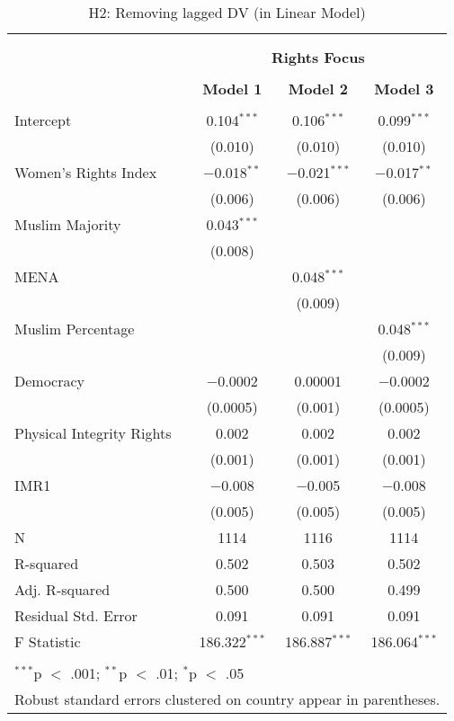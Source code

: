 
\begin{table}[!htbp] \centering 
  \caption{H2: Removing lagged DV (in Linear Model)} 
  \label{} 
\begin{tabular}{@{\extracolsep{5pt}}lccc} 
\\[-1.8ex]\hline \\[-1.8ex] 
\\[-1.8ex] & \multicolumn{3}{c}{\textbf{Rights Focus}} \\ 
\\[-1.8ex] & \textbf{Model 1} & \textbf{Model 2} & \textbf{Model 3}\\ 
\hline \\[-1.8ex] 
 Intercept & 0.104$^{***}$ & 0.106$^{***}$ & 0.099$^{***}$ \\ 
  & (0.010) & (0.010) & (0.010) \\ 
  Women's Rights Index & $-$0.018$^{**}$ & $-$0.021$^{***}$ & $-$0.017$^{**}$ \\ 
  & (0.006) & (0.006) & (0.006) \\ 
  Muslim Majority & 0.043$^{***}$ &  &  \\ 
  & (0.008) &  &  \\ 
  MENA &  & 0.048$^{***}$ &  \\ 
  &  & (0.009) &  \\ 
  Muslim Percentage &  &  & 0.048$^{***}$ \\ 
  &  &  & (0.009) \\ 
  Democracy & $-$0.0002 & 0.00001 & $-$0.0002 \\ 
  & (0.0005) & (0.001) & (0.0005) \\ 
  Physical Integrity Rights & 0.002 & 0.002 & 0.002 \\ 
  & (0.001) & (0.001) & (0.001) \\ 
  IMR1 & $-$0.008 & $-$0.005 & $-$0.008 \\ 
  & (0.005) & (0.005) & (0.005) \\ 
 N & 1114 & 1116 & 1114 \\ 
R-squared & 0.502 & 0.503 & 0.502 \\ 
Adj. R-squared & 0.500 & 0.500 & 0.499 \\ 
Residual Std. Error & 0.091 & 0.091 & 0.091 \\ 
F Statistic & 186.322$^{***}$ & 186.887$^{***}$ & 186.064$^{***}$ \\ 
\hline \\[-1.8ex] 
\multicolumn{4}{l}{$^{***}$p $<$ .001; $^{**}$p $<$ .01; $^{*}$p $<$ .05} \\ 
\multicolumn{4}{l}{Robust standard errors clustered on country appear in parentheses.} \\ 
\end{tabular} 
\end{table} 
